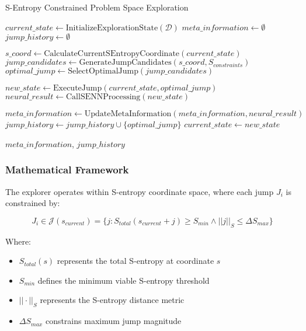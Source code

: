 \documentclass[12pt,a4paper]{article}
\begin{document}
\begin{algorithm}
\caption{S-Entropy Constrained Problem Space Exploration}
\begin{algorithmic}[1]
    \State $current\_state \gets \text{InitializeExplorationState}(\mathcal{D})$
    \State $meta\_information \gets \emptyset$
    \State $jump\_history \gets \emptyset$
    
        \State $s\_coord \gets \text{CalculateCurrentSEntropyCoordinate}(current\_state)$
        \State $jump\_candidates \gets \text{GenerateJumpCandidates}(s\_coord, S_{constraints})$
        \State $optimal\_jump \gets \text{SelectOptimalJump}(jump\_candidates)$
        
        \State $new\_state \gets \text{ExecuteJump}(current\_state, optimal\_jump)$
        \State $neural\_result \gets \text{CallSENNProcessing}(new\_state)$
        
        \State $meta\_information \gets \text{UpdateMetaInformation}(meta\_information, neural\_result)$
        \State $jump\_history \gets jump\_history \cup \{optimal\_jump\}$
        \State $current\_state \gets new\_state$
    \EndWhile
    
    \Return $meta\_information$, $jump\_history$
\EndProcedure
\end{algorithmic}
\end{algorithm}

\subsubsection{Mathematical Framework}

The explorer operates within S-entropy coordinate space, where each jump $J_i$ is constrained by:

\begin{equation}
J_i \in \mathcal{J}(s_{current}) = \{j : S_{total}(s_{current} + j) \geq S_{min} \land ||j||_{S} \leq \Delta S_{max}\}
\end{equation}

Where:
\begin{itemize}
\item $S_{total}(s)$ represents the total S-entropy at coordinate $s$
\item $S_{min}$ defines the minimum viable S-entropy threshold
\item $||\cdot||_{S}$ represents the S-entropy distance metric
\item $\Delta S_{max}$ constrains maximum jump magnitude
\end{itemize}
\end{document}
